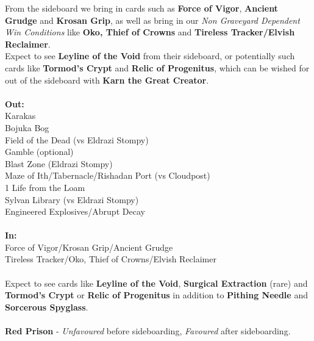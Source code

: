 \documentclass{report}
\begin{document}
From the sideboard we bring in cards such as \textbf{Force of Vigor}, \textbf{Ancient Grudge} and \textbf{Krosan Grip}, as well as bring in our \emph{Non Graveyard Dependent Win Conditions} like \textbf{Oko, Thief of Crowns} and \textbf{Tireless Tracker/Elvish Reclaimer}.\\ Expect to see \textbf{Leyline of the Void} from their sideboard, or potentially such cards like \textbf{Tormod's Crypt} and \textbf{Relic of Progenitus}, which can be wished for out of the sideboard with \textbf{Karn the Great Creator}.\\\\
\textbf{Out:}\\
Karakas\\Bojuka Bog\\Field of the Dead (vs Eldrazi Stompy)\\Gamble (optional)\\Blast Zone (Eldrazi Stompy)\\ Maze of Ith/Tabernacle/Rishadan Port (vs Cloudpost)\\1 Life from the Loam\\Sylvan Library (vs Eldrazi Stompy)\\Engineered Explosives/Abrupt Decay\\\\
\textbf{In:}\\
Force of Vigor/Krosan Grip/Ancient Grudge\\Tireless Tracker/Oko, Thief of Crowns/Elvish Reclaimer\\\\
Expect to see cards like \textbf{Leyline of the Void}, \textbf{Surgical Extraction} (rare) and \textbf{Tormod's Crypt} or \textbf{Relic of Progenitus} in addition to \textbf{Pithing Needle} and \textbf{Sorcerous Spyglass}.\\\\
\textbf{Red Prison} - \emph{Unfavoured} before sideboarding, \emph{Favoured} after sideboarding.\\
\end{document}
